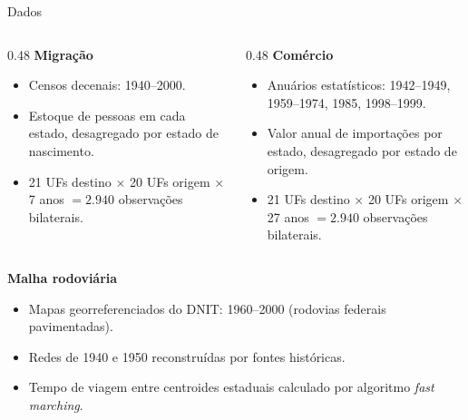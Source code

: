 \begin{frame}{Dados}
    \begin{columns}[T]
        \begin{column}{0.48\textwidth}
            \textbf{Migração}
            \begin{itemize}
                \item Censos decenais: 1940--2000.
                \item Estoque de pessoas em cada estado, desagregado por estado de nascimento.
                \item 21 UFs destino $\times$ 20 UFs origem $\times$ 7 anos $= 2.940$ observações bilaterais.
            \end{itemize}
        \end{column}
        \begin{column}{0.48\textwidth}
            \textbf{Comércio}
            \begin{itemize}
                \item Anuários estatísticos: 1942--1949, 1959--1974, 1985, 1998--1999.
                \item Valor anual de importações por estado, desagregado por estado de origem.
                \item 21 UFs destino $\times$ 20 UFs origem $\times$ 27 anos $= 2.940$ observações bilaterais.
            \end{itemize}
        \end{column}
    \end{columns}

    \vspace{0.4cm}

    \textbf{Malha rodoviária}
    \begin{itemize}
        \item Mapas georreferenciados do DNIT: 1960--2000 (rodovias federais pavimentadas).
        \item Redes de 1940 e 1950 reconstruídas por fontes históricas.
        \item Tempo de viagem entre centroides estaduais calculado por algoritmo \textit{fast marching}.
    \end{itemize}
\end{frame}

